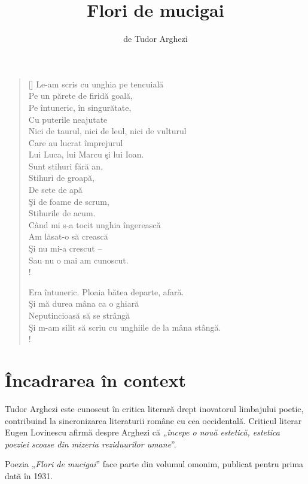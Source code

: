 \documentclass{article}
\title{Flori de mucigai}
\author{de Tudor Arghezi}
\date{}
\newcommand{\qu}[1]{„\emph{#1}”}
\begin{document}
\maketitle

\settowidth{\versewidth}{Şi m-am silit să scriu cu unghiile de la mâna stângă.}
\begin{verse}[\versewidth]
Le-am scris cu unghia pe tencuială \\
Pe un părete de firidă goală, \\
Pe întuneric, în singurătate, \\
Cu puterile neajutate \\
Nici de taurul, nici de leul, nici de vulturul \\
Care au lucrat împrejurul \\
Lui Luca, lui Marcu şi lui Ioan. \\
Sunt stihuri fără an, \\
Stihuri de groapă, \\
De sete de apă \\
Şi de foame de scrum, \\
Stihurile de acum. \\
Când mi s-a tocit unghia îngerească \\
Am lăsat-o să crească \\
Şi nu mi-a crescut -- \\
Sau nu o mai am cunoscut. \\!

Era întuneric. Ploaia bătea departe, afară. \\
Şi mă durea mâna ca o ghiară \\
Neputincioasă să se strângă \\
Şi m-am silit să scriu cu unghiile de la mâna stângă. \\!
\end{verse}

\section{Încadrarea în context}
Tudor Arghezi este cunoscut în critica literară drept inovatorul limbajului poetic, contribuind la sincronizarea literaturii române cu cea occidentală. Criticul literar Eugen Lovinescu afirmă despre Arghezi că \qu{începe o nouă estetică, estetica poeziei scoase din mizeria reziduurilor umane}.

Poezia \qu{Flori de mucigai} face parte din volumul omonim, publicat pentru prima dată în 1931.
\end{document}
